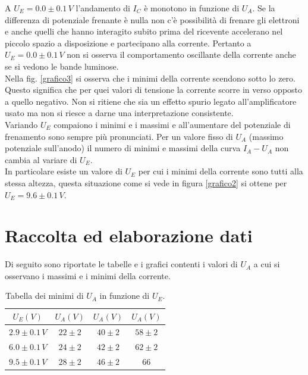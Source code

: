 \documentclass[10pt,a4paper]{article}
\begin{document}
A $U_E = 0.0 \pm0.1\, V$ l'andamento di $I_C$ è monotono in funzione di $U_A$.
Se la differenza di potenziale frenante è nulla non c'è possibilità di frenare gli elettroni e anche quelli che hanno interagito subito prima del ricevente accelerano nel piccolo spazio a disposizione e partecipano alla corrente. Pertanto a $U_E = 0.0\pm0.1\,V$ non si osserva il comportamento oscillante della corrente anche se si vedono le bande luminose.\\ 
Nella fig. \ref{grafico3} si osserva che i minimi della corrente scendono sotto lo zero. Questo significa che per quei valori di tensione la corrente scorre in verso opposto a quello negativo. Non si ritiene che sia un effetto spurio legato all'amplificatore usato ma non si riesce a darne una interpretazione consistente.\\
Variando $U_E$ compaiono i minimi e i massimi e all'aumentare del potenziale di frenamento sono sempre più pronunciati. Per un valore fisso di $U_A$ (massimo potenziale sull'anodo) il numero di minimi e massimi della curva $I_A-U_A$ non cambia al variare di $U_E$.\\

In particolare esiste un valore di $U_E$ per cui i minimi della corrente sono tutti alla stessa altezza, questa situazione come si vede in figura \ref{grafico2} si ottene per $U_E = 9.6 \pm0.1 \, V$.\\

\section{Raccolta ed elaborazione dati}

Di seguito sono riportate le tabelle e i grafici contenti i valori di $U_A$ a cui si osservano i massimi e i minimi della corrente.\\

\begin{table}[!htb]
\centering
\begin{tabular}{|c|c|c|c|}
\hline 
$U_E (V)$ & $U_A (V)$ & $U_A (V)$ & $U_A (V)$ \\ 
\hline 
$2.9\pm0.1\,V$ & $22\pm2$ & $40\pm2$ & $58\pm2$ \\ 
\hline 
$6.0\pm0.1\,V$ & $24\pm2$ & $42\pm2$ & $62\pm2$ \\ 
\hline 
$9.5\pm0.1\,V$ & $28\pm2$ & $46\pm2$ & $66$ \\ 
\hline 
\end{tabular}
\caption{Tabella dei minimi di $U_A$ in funzione di $U_E$.}
\label{tabellaMinimi} 
\end{table}
\end{document}
